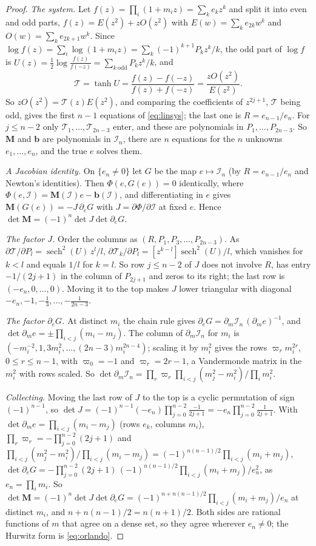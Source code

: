 \documentclass[pdflatex,sn-mathphys-num]{sn-jnl}
\theoremstyle{thmstyleone}%
\theoremstyle{thmstylethree}%
\newcommand{\cI}{\mathcal{I}}
\begin{document}
\begin{proof}
\emph{The system.} Let $f(z)=\prod_i(1+m_iz)=\sum_ke_kz^k$ and split it into even and odd parts, $f(z)=E(z^2)+zO(z^2)$ with $E(w)=\sum_ke_{2k}w^k$ and $O(w)=\sum_ke_{2k+1}w^k$. Since $\log f(z)=\sum_i\log(1+m_iz)=\sum_k(-1)^{k+1}P_kz^k/k$, the odd part of $\log f$ is $U(z)=\frac12\log\frac{f(z)}{f(-z)}=\sum_{k\ \mathrm{odd}}P_kz^k/k$, and
\[
  \mathcal T=\tanh U=\frac{f(z)-f(-z)}{f(z)+f(-z)}=\frac{zO(z^2)}{E(z^2)} .
\]
So $zO(z^2)=\mathcal T(z)E(z^2)$, and comparing the coefficients of $z^{2j+1}$, $\mathcal T$ being odd, gives the first $n-1$ equations of \eqref{eq:linsys}; the last one is $R=e_{n-1}/e_n$. For $j\le n-2$ only $\mathcal T_1,\dots,\mathcal T_{2n-3}$ enter, and these are polynomials in $P_1,\dots,P_{2n-3}$. So $\mathbf M$ and $\mathbf b$ are polynomials in $\cI_n$, there are $n$ equations for the $n$ unknowns $e_1,\dots,e_n$, and the true $e$ solves them.

\emph{A Jacobian identity.} On $\{e_n\ne0\}$ let $G$ be the map $e\mapsto\cI_n$ (by $R=e_{n-1}/e_n$ and Newton's identities). Then $\Phi(e,G(e))=0$ identically, where $\Phi(e,\cI)=\mathbf M(\cI)e-\mathbf b(\cI)$, and differentiating in $e$ gives $\mathbf M(G(e))=-J\,\partial_eG$ with $J=\partial\Phi/\partial\cI$ at fixed $e$. Hence $\det\mathbf M=(-1)^n\det J\det\partial_eG$.

\emph{The factor $J$.} Order the columns as $(R,P_1,P_3,\dots,P_{2n-3})$. As $\partial\mathcal T/\partial P_l=\operatorname{sech}^2(U)\,z^l/l$, $\partial\mathcal T_k/\partial P_l=[z^{k-l}]\operatorname{sech}^2(U)/l$, which vanishes for $k<l$ and equals $1/l$ for $k=l$. So row $j\le n-2$ of $J$ does not involve $R$, has entry $-1/(2j+1)$ in the column of $P_{2j+1}$ and zeros to its right; the last row is $(-e_n,0,\dots,0)$. Moving it to the top makes $J$ lower triangular with diagonal $-e_n,-1,-\frac13,\dots,-\frac1{2n-3}$.

\emph{The factor $\partial_eG$.} At distinct $m_i$ the chain rule gives $\partial_eG=\partial_m\cI_n\,(\partial_me)^{-1}$, and $\det\partial_me=\pm\prod_{i<j}(m_i-m_j)$. The column of $\partial_m\cI_n$ for $m_i$ is $(-m_i^{-2},1,3m_i^2,\dots,(2n-3)m_i^{2n-4})$; scaling it by $m_i^2$ gives the rows $\varpi_rm_i^{2r}$, $0\le r\le n-1$, with $\varpi_0=-1$ and $\varpi_r=2r-1$, a Vandermonde matrix in the $m_i^2$ with rows scaled. So $\det\partial_m\cI_n=\prod_r\varpi_r\prod_{i<j}(m_j^2-m_i^2)/\prod_im_i^2$.

\emph{Collecting.} Moving the last row of $J$ to the top is a cyclic permutation of sign $(-1)^{n-1}$, so $\det J=(-1)^{n-1}(-e_n)\prod_{j=0}^{n-2}\frac{-1}{2j+1}=-e_n\prod_{j=0}^{n-2}\frac1{2j+1}$. With $\det\partial_me=\prod_{i<j}(m_i-m_j)$ (rows $e_k$, columns $m_i$), $\prod_r\varpi_r=-\prod_{j=0}^{n-2}(2j+1)$ and $\prod_{i<j}(m_j^2-m_i^2)/\prod_{i<j}(m_i-m_j)=(-1)^{n(n-1)/2}\prod_{i<j}(m_i+m_j)$, $\det\partial_eG=-\prod_{j=0}^{n-2}(2j+1)\,(-1)^{n(n-1)/2}\prod_{i<j}(m_i+m_j)/e_n^2$, as $e_n=\prod_im_i$. So $\det\mathbf M=(-1)^n\det J\det\partial_eG=(-1)^{n+n(n-1)/2}\prod_{i<j}(m_i+m_j)/e_n$ at distinct $m_i$, and $n+n(n-1)/2=n(n+1)/2$. Both sides are rational functions of $m$ that agree on a dense set, so they agree wherever $e_n\ne0$; the Hurwitz form is \eqref{eq:orlando}.
\end{proof}
\end{document}
